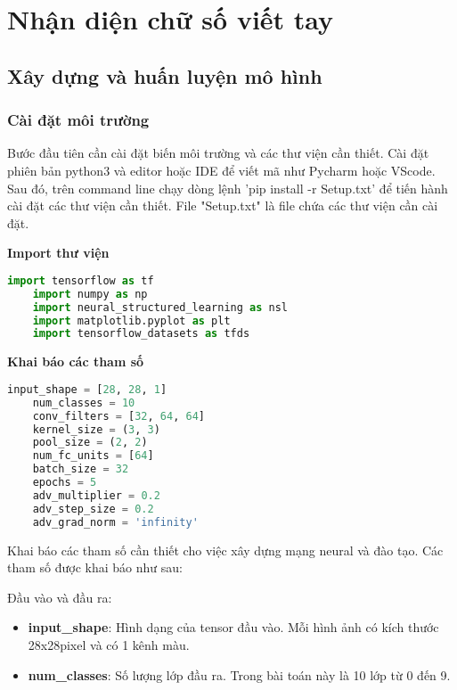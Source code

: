 
\chapter{Nhận diện chữ số viết tay} %

\label{Chapter3} %


\section{Xây dựng và huấn luyện mô hình}
\subsection{Cài đặt môi trường}

Bước đầu tiên cần cài đặt biến môi trường và các thư viện cần thiết. Cài đặt phiên bản python3 và editor hoặc IDE để viết mã như Pycharm hoặc VScode.
Sau đó, trên command line chạy dòng lệnh 'pip install -r Setup.txt' để tiến hành cài đặt các thư viện cần thiết. File "Setup.txt" là file chứa các thư viện 
cần cài đặt.

\textbf{Import thư viện}
\begin{lstlisting}[language=Python]
    import tensorflow as tf
    import numpy as np
    import neural_structured_learning as nsl
    import matplotlib.pyplot as plt
    import tensorflow_datasets as tfds
\end{lstlisting}

\textbf{Khai báo các tham số}
\begin{lstlisting}[language=Python]
    input_shape = [28, 28, 1]
    num_classes = 10
    conv_filters = [32, 64, 64]
    kernel_size = (3, 3)
    pool_size = (2, 2)
    num_fc_units = [64]
    batch_size = 32
    epochs = 5
    adv_multiplier = 0.2
    adv_step_size = 0.2
    adv_grad_norm = 'infinity'
\end{lstlisting}

Khai báo các tham số cần thiết cho việc xây dựng mạng neural và đào tạo. Các tham số được khai báo như sau:

Đầu vào và đầu ra:
\begin{itemize}
    \item \textbf{input\_shape}: Hình dạng của tensor đầu vào. Mỗi hình ảnh có kích thước 28x28pixel và có 1 kênh màu.
    \item \textbf{num\_classes}: Số lượng lớp đầu ra. Trong bài toán này là 10 lớp từ 0 đến 9.
\end{itemize}


